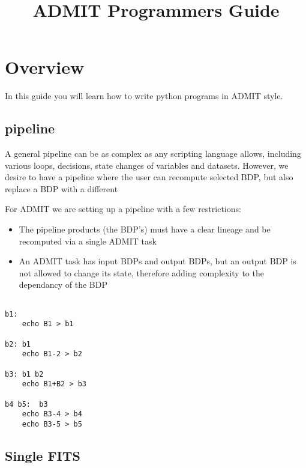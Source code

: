 \documentclass[preprint]{aastex}
\title{ADMIT Programmers Guide}
\begin{document}
\maketitle
\section{Overview}

In this guide you will learn how to write python programs in ADMIT style.

\subsection{pipeline}

A general pipeline can be as complex as any scripting language allows,
including various loops, decisions, state changes of variables
and datasets. However, we desire to have a pipeline where the user
can recompute selected BDP, but also replace a BDP with a different

For ADMIT we are setting up a pipeline with a few
restrictions:

\begin{itemize}

\item

The pipeline products (the BDP's) must have a clear lineage and be
recomputed via a single ADMIT task


\item
An ADMIT task has input BDPs and output BDPs, but an output BDP is not
allowed to change its state, therefore adding complexity to the dependancy
of the BDP

\end{itemize}

\footnotesize
\begin{verbatim}

b1:
	echo B1 > b1

b2:	b1
	echo B1-2 > b2

b3:	b1 b2
	echo B1+B2 > b3

b4 b5:	b3
	echo B3-4 > b4
	echo B3-5 > b5
\end{verbatim}
\normalsize

\subsection{Single FITS}
\end{document}
